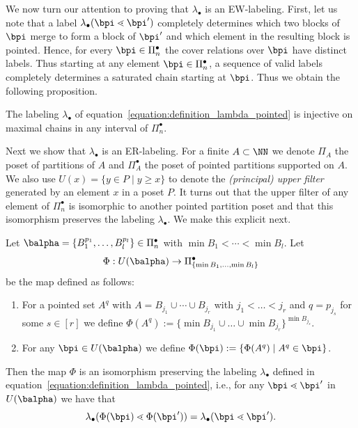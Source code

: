  
  We now turn our attention to proving that $\lambda_\bullet$ is an EW-labeling.  First, let us note that a label $\lambda_{\bullet}(\bpi \lessdot \bpi')$ completely determines which two blocks of $\bpi$ merge to form a block of $\bpi'$ and which element in the resulting block is pointed. Hence, for every $\bpi\in \Pi_n^{\bullet}$ the cover relations over $\bpi$ have distinct labels. Thus starting at any element $\bpi \in \Pi_n^{\bullet}$, a sequence of valid labels completely determines a saturated chain starting at $\bpi$. Thus we obtain the following proposition.

\begin{prop} \label{proposition:injectivity_pointed} The labeling $\lambda_{\bullet}$ of equation~\eqref{equation:definition_lambda_pointed} is injective on maximal chains in any interval of $\Pi_n^{\bullet}$.
\end{prop}


Next we show that $\lambda_{\bullet}$ is an ER-labeling. 
For a finite $A\subset \NN$ we denote $\Pi_A$ the poset of partitions of $A$ and $\Pi_A^{\bullet}$ the poset of pointed partitions supported on $A$. We also use $U(x)=\{y\in P \mid y\geq x\}$ to denote the \emph{(principal) upper filter} generated by an element $x$ in a poset $P$.  It turns out that the upper filter of any element of $\Pi_n^\bullet$ is isomorphic to another pointed partition poset and that this isomorphism preserves the labeling $\lambda_\bullet$.  We make this explicit next.  


\begin{lemma}\label{lemma:isomorphism_pointed_upper_filters} Let $\balpha=\{B_1^{p_1},\dots, B_l^{p_l}\} \in \Pi_n^{\bullet}$ with $\min B_1< \cdots < \min B_l$. Let $$\Phi:U(\balpha)\rightarrow \Pi_{\{\min B_1, \dots, \min B_l\}}^{\bullet}$$ be the map defined as follows:
\begin{enumerate}
    \item For a pointed set $A^q$  with  $A=B_{j_1}\cup\cdots \cup B_{j_r}$ with $j_1<\dots<j_r$ and $q=p_{j_s}$ for some $s\in [r]$ we define $\Phi(A^q):=\{\min B_{j_1}\cup\dots \cup \min B_{j_r}\}^{\min B_{j_s}}$. 
    \item For any $\bpi \in U(\balpha)$ we define $\Phi(\bpi):=\{\Phi(A^q)\mid A^q \in \bpi\}$.
\end{enumerate}
Then the map $\Phi$ is an isomorphism  preserving the labeling $\lambda_{\bullet}$ defined in equation~\eqref{equation:definition_lambda_pointed}, i.e., for any $\bpi \lessdot \bpi'$ in $U(\balpha)$ we have that 
$$\lambda_{\bullet}(\Phi(\bpi) \lessdot \Phi(\bpi'))=\lambda_{\bullet}(\bpi \lessdot \bpi').$$
\end{lemma}

